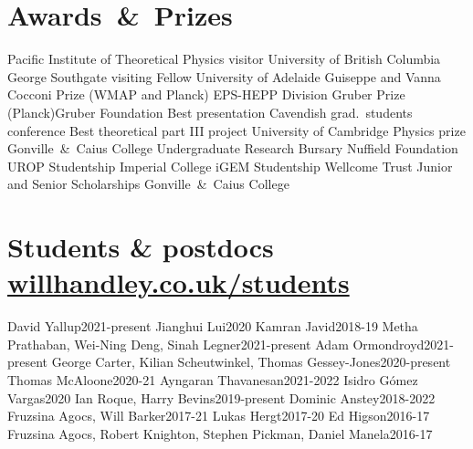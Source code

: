 \documentclass[11pt,a4paper,sans]{moderncv}
\begin{document}
\section{Awards~\&~Prizes}
  {Pacific Institute of Theoretical Physics visitor}         {University of British Columbia}
  {George Southgate visiting Fellow}         {University of Adelaide}
  {Guiseppe and Vanna Cocconi Prize (WMAP and Planck)}         {EPS-HEPP Division}
  {Gruber Prize (Planck)}{Gruber Foundation}
  {Best presentation}                 {Cavendish grad.\ students conference}
  {Best theoretical part III project} {University of Cambridge} 
\cvitemwithcomment{}            {Physics prize}                     {Gonville~\&~Caius College} 
 {Undergraduate Research Bursary}    {Nuffield Foundation}  
\cvitemwithcomment{}            {UROP Studentship}                  {Imperial College} 
 {iGEM Studentship}                  {Wellcome Trust} 
    {Junior and Senior Scholarships}    {Gonville~\&~Caius College} 

\section{Students \& postdocs \hfill\href{https://www.willhandley.co.uk/students}{willhandley.co.uk/students}}
  {David Yallup}{2021-present}
\cvitemwithcomment{}  {Jianghui Lui}{2020}
\cvitemwithcomment{}  {Kamran Javid}{2018-19}
  {Metha Prathaban, Wei-Ning Deng, Sinah Legner}{2021-present}
\cvitemwithcomment{}  {Adam Ormondroyd}{2021-present}
\cvitemwithcomment{}  {George Carter, Kilian Scheutwinkel, Thomas Gessey-Jones}{2020-present}
\cvitemwithcomment{}  {Thomas McAloone}{2020-21}
\cvitemwithcomment{}  {Ayngaran Thavanesan}{2021-2022}
\cvitemwithcomment{}  {Isidro G\'{o}mez Vargas}{2020}
\cvitemwithcomment{}  {Ian Roque, Harry Bevins}{2019-present}
\cvitemwithcomment{}  {Dominic Anstey}{2018-2022}
\cvitemwithcomment{}  {Fruzsina Agocs, Will Barker}{2017-21}
\cvitemwithcomment{}  {Lukas Hergt}{2017-20}
\cvitemwithcomment{}  {Ed Higson}{2016-17}
\cvitemwithcomment{}  {Fruzsina Agocs, Robert Knighton, Stephen Pickman, Daniel Manela}{2016-17}
\end{document}
